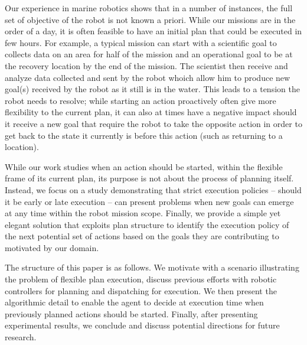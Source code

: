 Our experience in marine robotics shows that in a number of instances,
the full set of objective of the robot is not known a priori. While
our missions are in the order of a day, it is often feasible to have
an initial plan that could be executed in few hours. For example, a
typical mission can start with a scientific goal to collects data on
an area for half of the mission and an operational goal to be at the
recovery location by the end of the mission. The scientist then
receive and analyze data collected and sent by the robot whoich allow
him to produce new goal(s) received by the robot as it still is in the
water. This leads to a tension the robot needs to resolve;
 while starting an action proactively often give more flexibility 
to the current plan, it can also at times have a negative impact 
should it receive a new goal that require the robot to take the 
opposite action in order to get back to the state it currently is 
before  this action (such as returning to a location). 

While our work studies when an action should be started, within the
flexible frame of its current plan, its purpose is not about the
process of planning itself. Instead, we focus on a study demonstrating
that strict execution policies -- should it be early or late execution
-- can present problems when new goals can emerge at any time within
the robot mission scope. Finally, we provide a simple yet elegant
solution that exploits plan structure to identify the execution policy
of the next potential set of actions based on the goals they are
contributing to motivated by our domain.



The structure of this paper is as follows. We motivate with a
scenario illustrating the problem of flexible plan execution, discuss
previous efforts with robotic controllers for planning and dispatching
for execution. We then present the algorithmic detail to enable the
agent to decide at execution time when previously planned actions 
should be started. Finally, after presenting experimental results, 
we conclude and discuss potential directions for future research.

